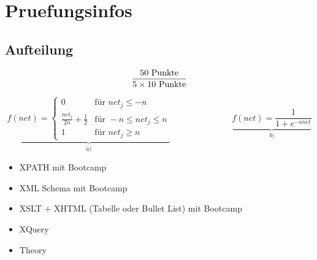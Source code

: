\chapter{Pruefungsinfos}
\section{Aufteilung}
\[
\frac{50 \textnormal{ Punkte}}{5 \times 10 \textnormal{ Punkte}}
\]

\[
\underbrace{f(net)=\begin{cases}
0 & \text{für } net_j \le -n \\
\frac{net_j}{2n} + \frac{1}{2} & \text{für } -n \le net_j \le n \\
1 &\text{für } net_j \ge n 
\end{cases}}_{a)} \hspace{3cm}
\underbrace{f(net)=\frac{1}{1+e^{-anet}}}_{b)}
\]

\begin{itemize}
\item XPATH mit Bootcamp
\item XML Schema mit Bootcamp
\item XSLT + XHTML (Tabelle oder Bullet List) mit Bootcamp
\item XQuery
\item Theory
\end{itemize}
